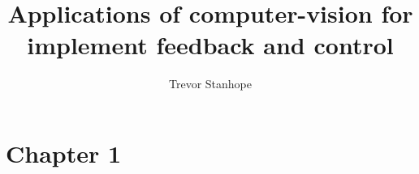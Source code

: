 \documentclass{elsarticle}
\begin{document}
\title{Applications of computer-vision for implement feedback and
  control}
\author{Trevor Stanhope}
\maketitle
\section{Chapter 1}
\end{document}
